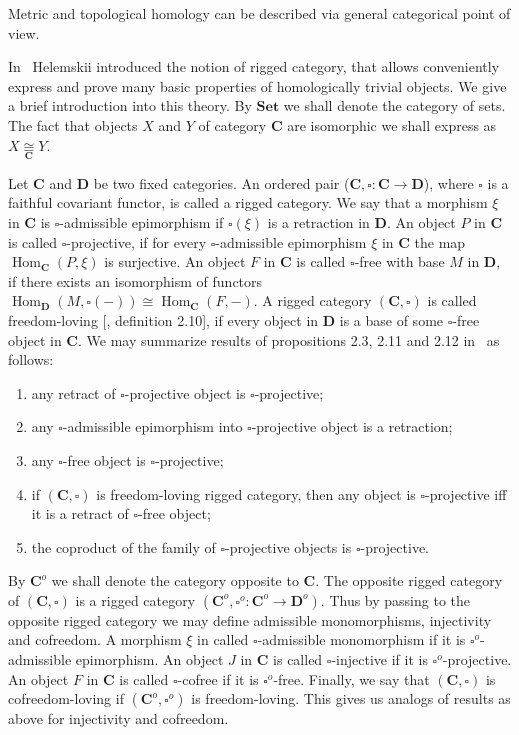 \documentclass[12pt]{article}
\newcommand{\isom}[1]{\mathop{\mathbin{\cong}}\limits_{#1}}
\begin{document}
Metric and topological homology can be described via general categorical point
of view.

In~\cite{HelMetrFrQMod} Helemskii introduced the notion of rigged category, that
allows conveniently express and prove many basic properties of homologically
trivial objects. We give a brief introduction into this theory. By
$\mathbf{Set}$ we shall denote the category of sets. The fact that objects $X$
and $Y$ of category $\mathbf{C}$ are isomorphic we shall express as
$X\isom{\mathbf{C}}Y$.

Let $\mathbf{C}$ and $\mathbf{D}$ be two fixed categories. An ordered pair
($\mathbf{C}, \square:\mathbf{C}\to\mathbf{D}$), where $\square$ is a faithful
covariant functor, is called a rigged category. We say that a morphism $\xi$ in
$\mathbf{C}$ is $\square$-admissible epimorphism if $\square (\xi)$ is a
retraction in $\mathbf{D}$. An object $P$ in $\mathbf{C}$ is called
$\square$-projective, if for every $\square$-admissible epimorphism $\xi$ in
$\mathbf{C}$ the map $\operatorname{Hom}_{\mathbf{C}}(P,\xi)$ is surjective. An
object $F$ in $\mathbf{C}$ is called $\square$-free with base $M$ in
$\mathbf{D}$, if there exists an isomorphism of functors
$\operatorname{Hom}_{\mathbf{D}}(M,\square(-))\cong
    \operatorname{Hom}_{\mathbf{C}}(F,-)$. A rigged category $(\mathbf{C},\square)$
is called  freedom-loving [\cite{HelMetrFrQMod}, definition 2.10], if every
object in $\mathbf{D}$ is a base of some $\square$-free object in $\mathbf{C}$.
We may summarize results of propositions 2.3, 2.11  and 2.12
in~\cite{HelMetrFrQMod} as follows:
\begin{enumerate}[label = (\roman*)]
    \item any retract of $\square$-projective object is $\square$-projective;
    \item any $\square$-admissible epimorphism into $\square$-projective object
          is a retraction;
    \item any $\square$-free object is $\square$-projective;
    \item if $(\mathbf{C},\square)$ is freedom-loving rigged category, then any
          object is $\square$-projective iff it is a retract of $\square$-free
          object;
    \item the coproduct of the family of $\square$-projective objects is
          $\square$-projective.
\end{enumerate}

By $\mathbf{C}^{o}$ we shall denote the category opposite to $\mathbf{C}$. The
opposite rigged category of $(\mathbf{C}, \square)$ is a rigged category
$(\mathbf{C}^{o},\square^{o}:\mathbf{C}^{o}\to\mathbf{D}^{o})$. Thus by passing
to the opposite rigged category we may define admissible monomorphisms,
injectivity and cofreedom. A morphism $\xi$ in called $\square$-admissible
monomorphism if it is $\square^o$-admissible epimorphism. An object $J$ in
$\mathbf{C}$ is called $\square$-injective if it is $\square^o$-projective. An
object $F$ in $\mathbf{C}$ is called $\square$-cofree if it is $\square^o$-free.
Finally, we say that $(\mathbf{C}, \square)$ is cofreedom-loving if
$(\mathbf{C}^{o}, \square^{o})$ is freedom-loving. This gives us analogs of
results as above for injectivity and cofreedom.
\end{document}
